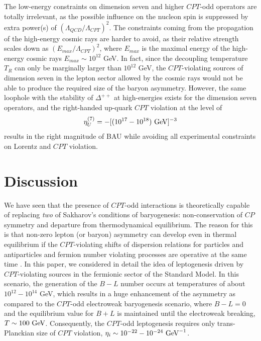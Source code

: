 \documentclass[12pt]{revtex4}
\newcommand{\GeV}{{\rm GeV}}
\begin{document}
The low-energy constraints on dimension seven and higher $CPT$-odd operators 
are totally irrelevant, as the possible influence on the nucleon spin is 
suppressed by extra power(s) of $(\Lambda_{QCD}/\Lambda_{CPT})^2$.  The constraints 
coming from the propagation of the high-energy cosmic rays are harder to avoid, as their 
relative strength scales down as $(E_{max}/\Lambda_{CPT})^2$, where $E_{max}$ is the maximal 
energy of the high-energy cosmic rays $E_{max}\sim 10^{12}$ GeV. In fact, since the decoupling
temperature $T_R$ can only be  marginally larger than $10^{12}$ GeV, the $CPT$-violating 
sources of dimension seven in the lepton sector allowed by the cosmic rays would not 
be able to produce the required size of the baryon asymmetry. However, the same loophole 
with the stability of $\Delta^{++}$ at high-energies 
exists for the dimension seven operators, and the right-handed up-quark $CPT$ violation
at the level of 
\begin{equation}
\eta^{(7)}_U = - [(10^{17}-10^{18})~ {\rm GeV}]^{-3}
\end{equation}
results in the right magnitude of BAU while avoiding all 
experimental constraints on Lorentz and $CPT$ violation.  







%
%
\section{Discussion}

	We have seen that the presence of $CPT$-odd interactions is theoretically capable
	of replacing \emph{two} of Sakharov's conditions of baryogenesis: non-conservation 
	of $CP$ symmetry and departure from thermodynamical equilibrium.
	The reason for this is that non-zero lepton (or baryon) asymmetry can develop even in 
thermal equilibrium if  the $CPT$-violating shifts of dispersion relations for particles 
and antiparticles and fermion number violating processes are operative at the 
same time \cite{Dolgov:1981hv}. In this paper, we considered in detail the idea of 
leptogenesis driven by $CPT$-violating sources in the fermionic sector of the 
Standard Model. In this scenario, the generation of the $B-L$ number 
occurs at temperatures of about $10^{12}-10^{14}$ GeV, which results in a huge enhancement of the 
asymmetry as compared to the $CPT$-odd electroweak baryogenesis scenario, where $B-L=0$ and 
the equilibrium value for $B+L$ is maintained until the electroweak breaking, 
	$T\sim 100~\GeV$. 
Consequently, the $CPT$-odd leptogenesis requires only trans-Planckian size of 
$CPT$ violation, $\eta_i \sim 10^{-22}-10^{-24}~\GeV^{-1}$. 
\end{document}
